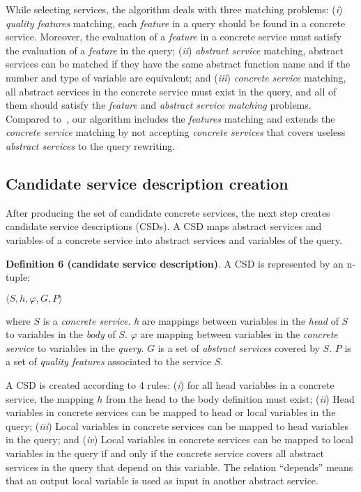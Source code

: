 While selecting services, the algorithm deals with three matching problems: 
(\textit{i}) \textit{quality features} matching, each \textit{feature} in a query should be found in a concrete service. Moreover, the evaluation of a \textit{feature} in a concrete service must satisfy the evaluation of a \textit{feature} in the query; 
(\textit{ii}) \textit{abstract service} matching, abstract services can be matched if they have the same abstract function name and if the number and type of variable are equivalent; and (\textit{iii}) \textit{concrete service} matching, all abstract services in the concrete service must exist in the query, and all of them should satisfy the \textit{feature} and \textit{abstract service matching} problems. 
Compared to~\cite{ba2014}, our algorithm includes the \textit{features} matching and extends the \textit{concrete service} matching by not accepting \textit{concrete services} that covers useless \textit{abstract services} to the query rewriting.

\subsection{Candidate service description creation}

After producing the set of candidate concrete services, the next step 
creates candidate service descriptions (CSDs). 
A CSD maps abstract services and variables of a concrete service into abstract 
services and variables of the query. 

\noindent \textbf{Definition 6 (candidate service description)}.
A CSD is represented by an n-tuple:
\begin{center}
$\langle S, h, \varphi, G, P\rangle$
\end{center}
where $S$ is a \textit{concrete service}. 
\textit{h} are mappings between variables in the \textit{head} of $S$ to variables in the \textit{body} of $S$. 
$\varphi$ are mapping between variables in the \textit{concrete service} to variables in the \textit{query}.
$G$ is a set of \textit{abstract services} covered by $S$. 
$P$ is a set of \textit{quality features} associated to the service $S$. 
 
A CSD is created according to 4 rules: (\textit{i}) for all head variables in a
concrete service, the mapping $h$ from the head to the body definition must
exist; (\textit{ii}) Head variables in concrete services can be mapped to head
or local variables in the query; (\textit{iii}) Local variables in concrete
services can be mapped to head variables in the query; and (\textit{iv}) Local
variables in concrete services can be mapped to local variables in the query if and only if the concrete service covers all abstract services in the query that depend on this variable. The relation ``depends''  means that an output local variable is used as input in another abstract service.

